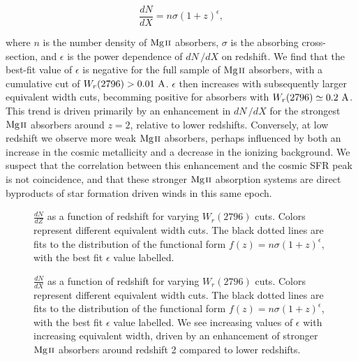 \documentclass[iop,apj,numberedappendix,appendixfloats,twocolappendix]{emulateapj}
\begin{document}
\begin{equation}
\frac{dN}{dX} = n\sigma (1 + z)^{\epsilon},
\label{eqn:dndxfit}
\end{equation}

where $n$ is the number density of ${\hbox{{\rm Mg}\kern 0.1em{\sc ii}}}$ absorbers, $\sigma$ is the absorbing cross-section, and $\epsilon$ is the power dependence of $dN\,/dX$ on redshift. We find that the best-fit value of $\epsilon$ is negative for the full sample of ${\hbox{{\rm Mg}\kern 0.1em{\sc ii}}}$ absorbers, with a cumulative cut of $W_r(2796) > 0.01~\mathrm{\AA}$. $\epsilon$ then increases with subsequently larger equivalent width cuts, becomming positive for absorbers with $W_r(2796) \simeq 0.2~\mathrm{\AA}$. This trend is driven primarily by an enhancement in $dN\,/dX$ for the strongest ${\hbox{{\rm Mg}\kern 0.1em{\sc ii}}}$ absorbers around $z = 2$, relative to lower redshifts. Conversely, at low redshift we observe more weak ${\hbox{{\rm Mg}\kern 0.1em{\sc ii}}}$ absorbers, perhaps influenced by both an increase in the cosmic metallicity and a decrease in the ionizing background. We suspect that the correlation between this enhancement and the cosmic SFR peak is not coincidence, and that these stronger ${\hbox{{\rm Mg}\kern 0.1em{\sc ii}}}$ absorption systems are direct byproducts of star formation driven winds in this same epoch. 

\begin{figure}[bth]
\caption{$\frac{dN}{dZ}$ as a function of redshift for varying $W_r(2796)$ cuts. Colors represent different equivalent width cuts. The black dotted lines are fits to the distribution of the functional form $f(z) = n\sigma (1 + z)^{\epsilon}$, with the best fit $\epsilon$ value labelled.}
\label{fig:dndz_cuts}
\end{figure}

\begin{figure}[bth]
\caption{$\frac{dN}{dX}$ as a function of redshift for varying $W_r(2796)$ cuts. Colors represent different equivalent width cuts. The black dotted lines are fits to the distribution of the functional form $f(z) = n\sigma (1 + z)^{\epsilon}$, with the best fit $\epsilon$ value labelled. We see increasing values of $\epsilon$ with increasing equivalent width, driven by an enhancement of stronger ${\hbox{{\rm Mg}\kern 0.1em{\sc ii}}}$ absorbers around redshift 2 compared to lower redshifts.}
\label{fig:dndx_cuts}
\end{figure}
\end{document}
